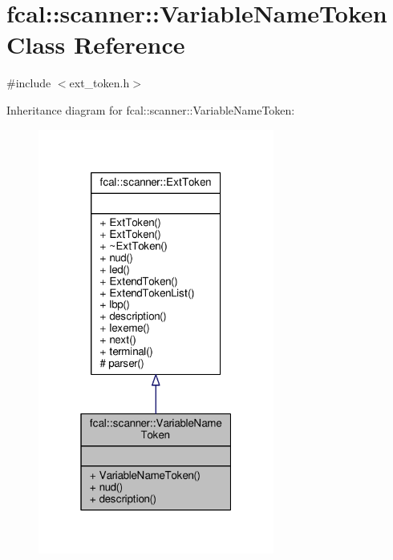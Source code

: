 \hypertarget{classfcal_1_1scanner_1_1VariableNameToken}{}\section{fcal\+:\+:scanner\+:\+:Variable\+Name\+Token Class Reference}
\label{classfcal_1_1scanner_1_1VariableNameToken}


{\ttfamily \#include $<$ext\+\_\+token.\+h$>$}



Inheritance diagram for fcal\+:\+:scanner\+:\+:Variable\+Name\+Token\+:
\nopagebreak
\begin{figure}[H]
\begin{center}
\leavevmode
\includegraphics[width=220pt]{classfcal_1_1scanner_1_1VariableNameToken__inherit__graph}
\end{center}
\end{figure}


